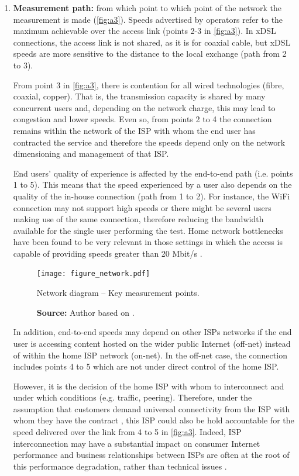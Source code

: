 \documentclass[12pt]{article}
\begin{document}
\begin{enumerate}[label=\textbf{\arabic* --}]
	\item \textbf{Measurement path:} from which point to which point of the network the measurement is made (\autoref{fig:a3}). Speeds advertised by operators refer to the maximum achievable over the access link (points 2-3 in \autoref{fig:a3}). In xDSL connections, the access link is not shared, as it is for coaxial cable, but xDSL speeds are more sensitive to the distance to the local exchange (path from 2 to 3). 
	
	From point 3 in \autoref{fig:a3}, there is contention for all wired technologies (fibre, coaxial, copper). That is, the transmission capacity is shared by many concurrent users and, depending on the network charge, this may lead to congestion and lower speeds. Even so, from points 2 to 4 the connection remains within the network of the ISP with whom the end user has contracted the service and therefore the speeds depend only on the network dimensioning and management of that ISP.
	
	End users' quality of experience is affected by the end-to-end path (i.e. points 1 to 5). This means that the speed experienced by a user also depends on the quality of the in-house connection (path from 1 to 2). For instance, the WiFi connection may not support high speeds or there might be several users making use of the same connection, therefore reducing the bandwidth available for the single user performing the test. Home network bottlenecks have been found to be very relevant in those settings in which the access is capable of providing speeds greater than 20 Mbit/s \citep{sundaresan2016}. 
	
\begin{figure}[H]
    \centering
        \texttt{[image: figure\_network.pdf]}
        \caption{Network diagram -- Key measurement points.}
        \caption*{\textbf{Source:} Author based on \cite{bauer2010}.}
        \label{fig:a3}
\end{figure}   
	
	In addition, end-to-end speeds may depend on other ISPs networks if the end user is accessing content hosted on the wider public Internet (off-net) instead of within the home ISP network (on-net). In the off-net case, the connection includes points 4 to 5 which are not under direct control of the home ISP. 
	
	However, it is the decision of the home ISP with whom to interconnect and under which conditions (e.g. traffic, peering). Therefore, under the assumption that customers demand universal connectivity from the ISP with whom they have the contract \citep[see][pp. 508-511]{economides2008}, this ISP could also be hold accountable for the speed delivered over the link from 4 to 5 in \autoref{fig:a3}. Indeed, ISP interconnection may have a substantial impact on consumer Internet performance and business relationships between ISPs are often at the root of this performance degradation, rather than technical issues \citep{m2014isp}.    


\end{enumerate}
\end{document}
